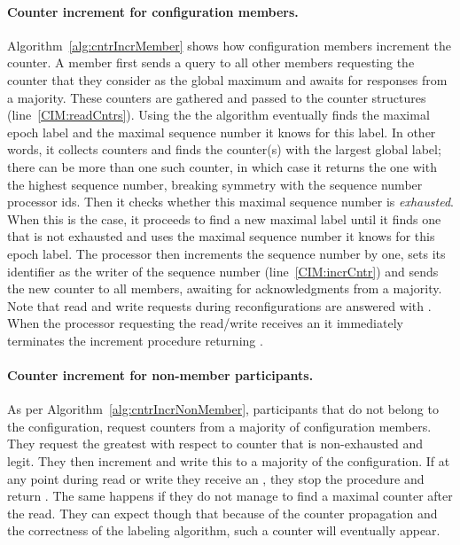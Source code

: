 \documentclass[11pt]{article}
\begin{document}
\paragraph{Counter increment for configuration members.} Algorithm~\ref{alg:cntrIncrMember} shows how configuration members increment the counter. 
A member  first sends a query to all other members requesting the counter that they consider as the global maximum and awaits for responses from a majority.
These counters are gathered and passed to the counter structures (line~\ref{CIM:readCntrs}). 
Using the  the algorithm eventually finds the maximal epoch label and the maximal sequence number it knows for this label. 
In other words, it collects counters and finds the counter(s) with the largest global label; there can be more than one such counter, in which case it returns the one with the highest sequence number, breaking symmetry with the sequence number processor ids. 
Then it checks whether this maximal sequence number is {\em exhausted}.
When this is the case, it proceeds to find a new maximal label  until it finds one that is not exhausted and uses the maximal sequence number it knows for this epoch label. 
The processor then increments the sequence number by one, sets its identifier as the writer of the sequence number (line~\ref{CIM:incrCntr}) and sends the new counter to all members, awaiting for acknowledgments from a majority.
Note that read and write requests during reconfigurations are answered with .
When the processor requesting the read/write receives an  it immediately terminates the increment procedure returning .




\paragraph{Counter increment for non-member participants.} 
As per Algorithm~\ref{alg:cntrIncrNonMember}, participants that do not  belong to the configuration, request counters from a majority of configuration members.
They request the greatest with respect to  counter that is non-exhausted and legit. They then increment and write this to a majority of the configuration.
If at any point during read or write they receive an , they stop the procedure and return .
The same happens if they do not manage to find a maximal counter after the read.
They can expect though that because of the counter propagation and the correctness of the labeling algorithm, such a counter will eventually appear.
\end{document}
